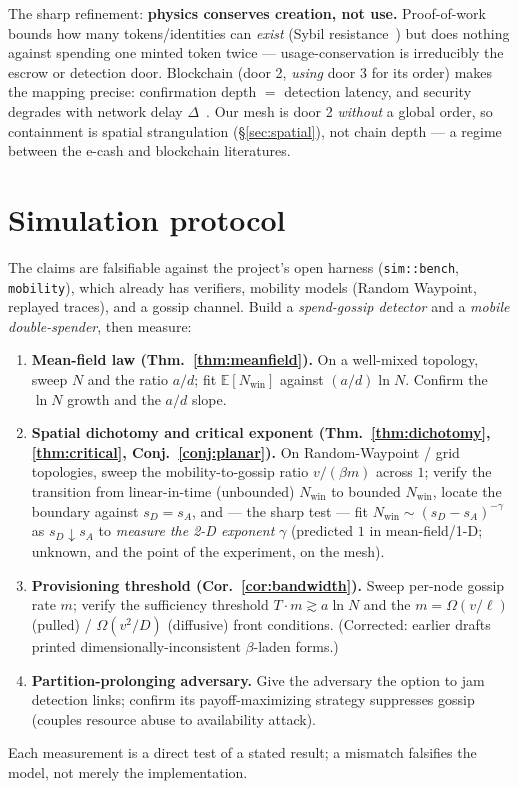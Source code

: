 \documentclass[11pt]{article}
\theoremstyle{plain}
\theoremstyle{definition}
\newcommand{\Nwin}{N_{\mathrm{win}}}
\newcommand{\E}{\mathbb{E}}
\begin{document}
The sharp refinement: \textbf{physics conserves creation, not use.} Proof-of-work
bounds how many tokens/identities can \emph{exist} (Sybil
resistance~\cite{Douceur2002Sybil,Back2002Hashcash}) but does nothing against
spending one minted token twice --- usage-conservation is irreducibly the escrow or
detection door. Blockchain (door 2, \emph{using} door 3 for its order) makes the
mapping precise: confirmation depth $=$ detection latency, and security degrades
with network delay $\Delta$~\cite{PassSeemanShelat2017,Rosenfeld2014Hashrate}. Our
mesh is door 2 \emph{without} a global order, so containment is spatial strangulation
(\S\ref{sec:spatial}), not chain depth --- a regime between the e-cash and
blockchain literatures.

\section{Simulation protocol}\label{sec:sim}

The claims are falsifiable against the project's open harness (\texttt{sim::bench},
\texttt{mobility}), which already has verifiers, mobility models (Random Waypoint,
replayed traces), and a gossip channel. Build a \emph{spend-gossip detector} and a
\emph{mobile double-spender}, then measure:
\begin{enumerate}[leftmargin=1.6em,itemsep=1pt]
  \item \textbf{Mean-field law (Thm.~\ref{thm:meanfield}).} On a well-mixed
  topology, sweep $N$ and the ratio $a/d$; fit $\E[\Nwin]$ against $(a/d)\ln N$.
  Confirm the $\ln N$ growth and the $a/d$ slope.
  \item \textbf{Spatial dichotomy and critical exponent (Thm.~\ref{thm:dichotomy},
  \ref{thm:critical}, Conj.~\ref{conj:planar}).} On Random-Waypoint / grid
  topologies, sweep the mobility-to-gossip ratio $v/(\beta m)$ across $1$; verify the
  transition from linear-in-time (unbounded) $\Nwin$ to bounded $\Nwin$, locate the
  boundary against $s_D=s_A$, and --- the sharp test --- fit $\Nwin\sim(s_D-s_A)^{-\gamma}$
  as $s_D\downarrow s_A$ to \emph{measure the 2-D exponent} $\gamma$ (predicted $1$
  in mean-field/1-D; unknown, and the point of the experiment, on the mesh).
  \item \textbf{Provisioning threshold (Cor.~\ref{cor:bandwidth}).} Sweep per-node
  gossip rate $m$; verify the sufficiency threshold $T\cdot m \gtrsim a\ln N$ and the
  $m=\Omega(v/\ell)$ (pulled) / $\Omega(v^2/D)$ (diffusive) front conditions.
  (Corrected: earlier drafts printed dimensionally-inconsistent $\beta$-laden
  forms.)
  \item \textbf{Partition-prolonging adversary.} Give the adversary the option to
  jam detection links; confirm its payoff-maximizing strategy suppresses gossip
  (couples resource abuse to availability attack).
\end{enumerate}
Each measurement is a direct test of a stated result; a mismatch falsifies the
model, not merely the implementation.
\end{document}
